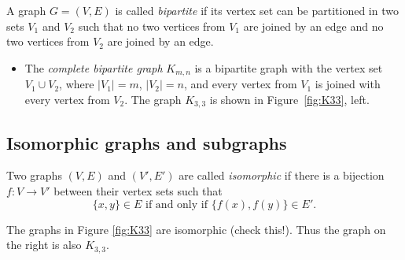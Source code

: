 \begin{page}

\begin{dfn}
A graph $G = (V, E)$ is called \emph{bipartite} if its vertex set can be partitioned in two sets $V_1$ and $V_2$ such that
no two vertices from $V_1$ are joined by an edge and no two vertices from $V_2$ are joined by an edge.
\end{dfn}

\end{page}

\begin{page}


\begin{itemize}
\item
The \emph{complete bipartite graph} $K_{m,n}$ is a bipartite graph with the vertex set $V_1 \cup V_2$,
where $|V_1| = m$, $|V_2| = n$, and every vertex from $V_1$ is joined with every vertex from $V_2$.
The graph $K_{3,3}$ is shown in Figure~\ref{fig:K33}, left.
\end{itemize}



\end{page}

\begin{page}

\subsection{Isomorphic graphs and subgraphs}
\label{sec:Subgraphs}

\end{page}

\begin{page}

\begin{dfn}
Two graphs $(V, E)$ and $(V', E')$ are called \emph{isomorphic} if there is a bijection $f \colon V \to V'$
between their vertex sets such that
\[
\{x, y\} \in E \text{ if and only if } \{f(x), f(y)\} \in E'.
\]
\end{dfn}

\end{page}

\begin{page}

\begin{exl}
The graphs in Figure \ref{fig:K33} are isomorphic (check this!).
Thus the graph on the right is also $K_{3,3}$.
\end{exl}

\end{page}


